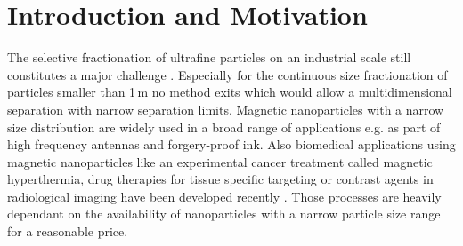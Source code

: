 
\chapter{Introduction and Motivation}
\label{ch:Introduction}
The selective fractionation of ultrafine particles on an industrial scale still constitutes a major challenge \cite{mandel2012magnetic}. Especially for the continuous size fractionation of particles smaller than 1\,\textmu m no method exits which would allow a multidimensional separation with narrow separation limits. Magnetic nanoparticles with a narrow size distribution are widely used in a broad range of applications e.g. as part of high frequency antennas and forgery-proof ink. Also biomedical applications using magnetic nanoparticles like an experimental cancer treatment called magnetic hyperthermia, drug therapies for tissue specific targeting or contrast agents in radiological imaging have been developed recently \cite{mohammed2017magnetic}. Those processes are heavily dependant on the availability of nanoparticles with a narrow particle size range for a reasonable price.   
